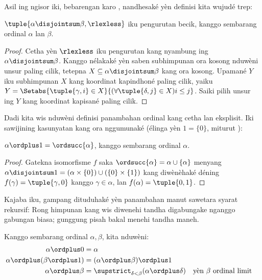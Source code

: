 \documentclass[../../../include/open-logic-section]{subfiles}
\begin{document}
Asil ing ngisor iki, bebarengan karo
, nandhesaké
yèn definisi kita wujudé trep:

\begin{lem}
$\tuple{\alpha \disjointsum \beta, \rlexless}$ iku pengurutan becik,
kanggo sembarang ordinal $\alpha$ lan $\beta$.
\end{lem}

\begin{proof}
Cetha yèn $\rlexless$ iku pengurutan kang nyambung ing $\alpha \disjointsum \beta$. Kanggo
nélakaké yèn saben subhimpunan ora kosong nduwèni unsur paling cilik, tetepna $X \subseteq \alpha
\disjointsum \beta$ kang ora kosong. Upamané $Y$ iku subhimpunan $X$ kang koordinat kapindhoné paling cilik, yaiku\ $Y = \Setabs{\tuple{\gamma, i} \in X}{(\forall \tuple{\delta, j} \in X)i \leq j}$. Saiki pilih unsur ing $Y$ kang koordinat kapisané paling cilik.
\end{proof}
\noindent
Dadi kita wis nduwèni definisi panambahan ordinal kang cetha
lan eksplisit. Iki sawijining kasunyatan kang ora nggumunaké
(élinga yèn $1 = \{0\}$, miturut
):
\begin{prop}
$\alpha \ordplus  1 = \ordsucc{\alpha}$, kanggo sembarang ordinal $\alpha$.
\end{prop}

\begin{proof}
Gatekna isomorfisme $f$ saka $\ordsucc{\alpha} = \alpha \cup
\{\alpha\}$ menyang $\alpha\disjointsum1 = (\alpha \times \{0\})
\cup (\{0\} \times \{1\})$ kang diwènèhaké déning $f(\gamma) =
\tuple{\gamma, 0}$ kanggo $\gamma \in \alpha$, lan $f(\alpha) = \tuple{0,
1}$.
\end{proof}
\noindent
Kajaba iku, gampang dituduhaké yèn panambahan manut sawetara
syarat rekursif:
Rong himpunan kang wis diwenehi tandha digabungake nganggo gabungan biasa; gunggung pisah bakal menehi tandha maneh.

\begin{lem}
Kanggo sembarang ordinal $\alpha, \beta$, kita nduwèni:
\begin{align*}
	\alpha\ordplus 0 &= \alpha\\
	\alpha \ordplus  (\beta\ordplus 1) &= (\alpha \ordplus  \beta) \ordplus  1\\
	\alpha  \ordplus  \beta &= \supstrict_{\delta < \beta}(\alpha \ordplus  \delta) && \text{yèn $\beta $ ordinal limit}
\end{align*}
\end{lem}
\end{document}
